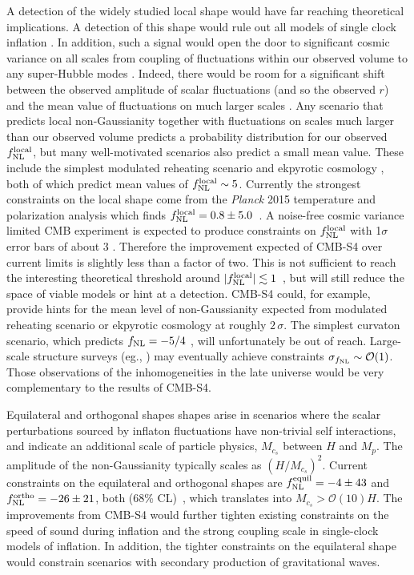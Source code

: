 A detection of the widely studied local shape would have far reaching theoretical implications. A detection of this shape would rule out all models of single clock inflation \cite{Creminelli:2004yq}. In addition, such a signal would open the door to significant cosmic variance on all scales from coupling of fluctuations within our observed volume to any super-Hubble modes \cite{Nelson:2012sb,LoVerde:2013xka,Nurmi:2013xv}. Indeed, there would be room for a significant shift between the observed amplitude of scalar fluctuations (and so the observed $r$) and the mean value of fluctuations on much larger scales \cite{Bonga:2015urq}. Any scenario that predicts local non-Gaussianity together with fluctuations on scales much larger than our observed volume predicts a probability distribution for our observed $f_{\rm NL}^{\rm local}$, but many well-motivated scenarios also predict a small mean value. These include the simplest modulated reheating scenario \cite{Zaldarriaga:2003my} and ekpyrotic cosmology \cite{Lehners:2009ja}, both of which predict mean values of $f_{\rm NL}^{\rm local}\sim5$. 
Currently the strongest constraints on the local shape come from the {\it Planck} 2015 temperature and polarization analysis which finds $f_{\rm NL}^{\rm local} = 0.8 \pm 5.0$~\cite{Ade:2015ava}. A noise-free cosmic variance limited CMB experiment is expected to produce constraints on $f_{\rm NL}^{\rm local}$ with 1$\sigma$ error bars of about 3 \cite{Komatsu:2001rj}. Therefore the improvement expected of CMB-S4 over current limits is slightly less than a factor of two. This is not sufficient to reach the interesting theoretical threshold around $|f_{\rm NL}^{\rm local}|\lesssim 1$~\cite{Alvarez:2014vva}, but will still reduce the space of viable models or hint at a detection. CMB-S4 could, for example, provide hints for the mean level of non-Gaussianity expected from modulated reheating scenario or ekpyrotic cosmology at roughly $2\,\sigma$. The simplest curvaton scenario, which predicts $f_{\rm NL} = -5/4$ \cite{Lyth:2001nq}, will unfortunately be out of reach. Large-scale structure surveys (eg., \cite{Dore:2014cca}) may eventually achieve constraints $\sigma_{f_{\rm NL}}\sim\mathcal{O}(1)$. Those observations of the inhomogeneities in the late universe would be very complementary to the results of CMB-S4.

Equilateral and orthogonal shapes shapes arise in scenarios where the scalar perturbations sourced by inflaton fluctuations have non-trivial self interactions, and indicate an additional scale of particle physics, $M_{c_s}$ between $H$ and $M_p$. The amplitude of the non-Gaussianity typically scales as $(H/M_{c_s})^2$. Current constraints on the equilateral and orthogonal shapes are $f_{\rm NL}^{\rm equil} = -4 \pm 43$ and $f_{\rm NL}^{\rm ortho} = -26 \pm 21$, both (68\% CL)~\cite{Ade:2015ava}, which translates into $M_{c_s}>\mathcal{O}(10)H$. The improvements from CMB-S4 would further tighten existing constraints on the speed of sound during inflation and the strong coupling scale in single-clock models of inflation. In addition, the tighter constraints on the equilateral shape would constrain scenarios with secondary production of gravitational waves.

